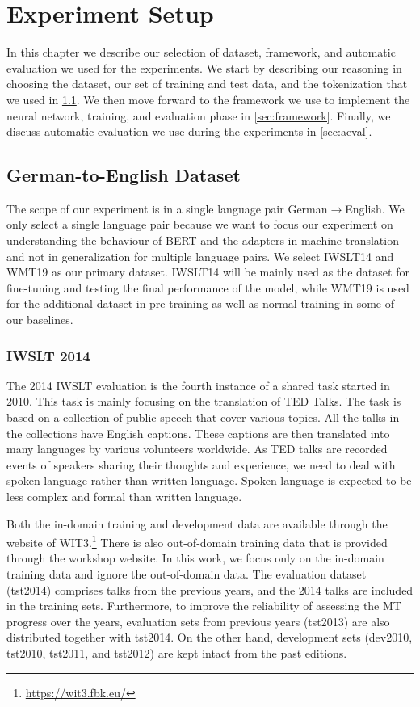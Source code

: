 
\chapter{Experiment Setup}
\label{chap:03}
In this chapter we describe our selection of dataset, framework, and automatic evaluation we used for the experiments. We start by describing our reasoning in choosing the dataset, our set of training and test data, and the tokenization that we used in \cref{sec:dataset}. We then move forward to the framework we use to implement the neural network, training, and evaluation phase in \cref{sec:framework}. Finally, we discuss automatic evaluation we use during the experiments in  \cref{sec:aeval}.

\section{German-to-English Dataset}
\label{sec:dataset}
The scope of our experiment is in a single language pair German$\rightarrow$English. We only select a single language pair because we want to focus our experiment on understanding the behaviour of BERT and the adapters in machine translation and not in generalization for multiple language pairs. We select IWSLT14 and WMT19 as our primary dataset. IWSLT14 will be mainly used as the dataset for fine-tuning and testing the final performance of the model, while WMT19 is used for the additional dataset in pre-training as well as normal training in some of our baselines.

\subsection{IWSLT 2014}
The 2014 IWSLT evaluation \cite{Cettolo2014ReportOT} is the fourth instance of a shared task started in 2010. This task is mainly focusing on the translation of TED Talks. The task is based on a collection of public speech that cover various topics. All the talks in the collections have English captions. These captions are then translated into many languages by various volunteers worldwide. As TED talks are recorded events of speakers sharing their thoughts and experience, we  need to deal with spoken language rather than written language. Spoken language is expected to be less complex and formal than written language.

Both the in-domain training and development data are available through the website of WIT3.\footnote{\url{https://wit3.fbk.eu/}} There is also out-of-domain training data that is provided through the workshop website. In this work, we focus only on the in-domain training data and ignore the out-of-domain data. The evaluation dataset (tst2014) comprises talks from the previous years, and the 2014 talks are included in the training sets. Furthermore, to improve the reliability of assessing the MT progress over the years, evaluation sets from previous years (tst2013) are also distributed together with tst2014. On the other hand, development sets (dev2010, tst2010, tst2011, and tst2012) are kept intact from the past editions.

